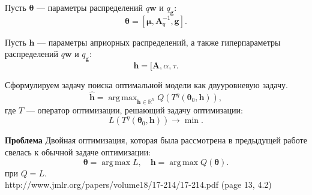 \documentclass[12pt]{article}
\DeclareMathOperator*{\argmax}{arg\,max}
\begin{document}
Пусть $\boldsymbol{\theta}$ --- параметры распределений $q\mathbf{w}$ и $q_\mathbf{g}$:
\[
    \boldsymbol{\theta} = [\boldsymbol{\mu}, \mathbf{A}_q^{-1}, \mathbf{g}].
\] 

Пусть $\mathbf{h}$ --- параметры априорных распределений, а также гиперпараметры распределений  $q\mathbf{w}$ и $q_\mathbf{g}$:
\[
    \mathbf{h} = [\mathbf{A}, \alpha, \tau.
\]


Сформулируем задачу поиска оптимальной модели как двууровневую задачу.
\begin{equation}
\label{eq:optim}
	\hat{\mathbf{h}} = \argmax_{\mathbf{h} \in \mathbb{R}^h} Q( T^\eta(\boldsymbol{\theta}_0, \mathbf{h})),
\end{equation}
где $T$ --- оператор оптимизации, решающий задачу оптимизации:
\[
    L(T^\eta(\boldsymbol{\theta}_0, \mathbf{h})) \to \min.
\]

\textbf{Проблема}
Двойная оптимизация, которая была рассмотрена в предыдущей работе свелась к обычной задаче оптимизации:
\[
    \boldsymbol{\theta} = \argmax L, \quad  \mathbf{h} = \argmax{Q}(\boldsymbol{\theta}). 
\]
при $Q = L$.\\
http://www.jmlr.org/papers/volume18/17-214/17-214.pdf (page 13, 4.2)
\fi
\end{document}
